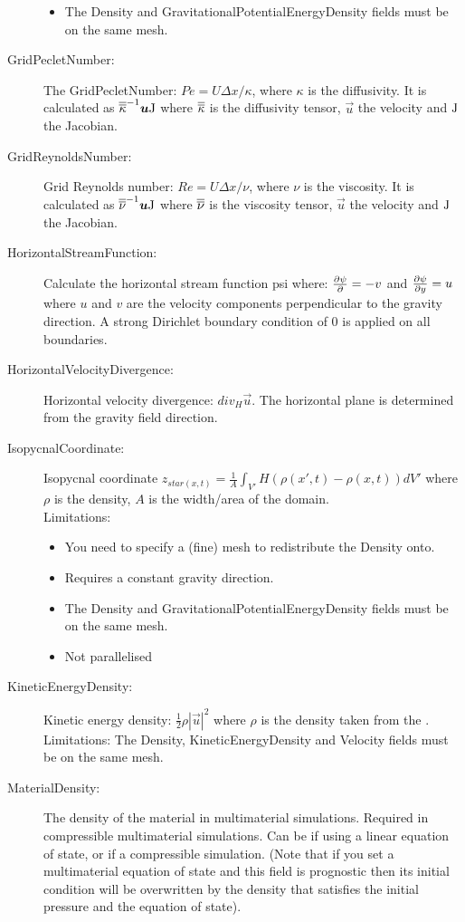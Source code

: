 \begin{description}
\begin{itemize}
	\item The Density and GravitationalPotentialEnergyDensity fields must be on the same mesh. 
	\end{itemize}
\item[GridPecletNumber:]The GridPecletNumber: $Pe = U\Delta x/\kappa$, where $\kappa$ is the diffusivity. It is calculated as $\tensor{\kappa}^{-1}\vec{u}\mat{J}$ where $\tensor{\kappa}$ is the diffusivity tensor, $\vec{u}$ the velocity and $\mat{J}$ the Jacobian.
\item[GridReynoldsNumber:]Grid Reynolds number: $Re = U\Delta x/\nu$, where $\nu$ is the viscosity. It is calculated as $\tensor{\nu}^{-1}\vec{u}\mat{J}$ where $\tensor{\nu}$ is the viscosity tensor, $\vec{u}$ the velocity and $\mat{J}$ the Jacobian.
\item[HorizontalStreamFunction:]Calculate the horizontal stream function psi where:  $\ppx[]{\psi} = -v$ and  $\ppx[y]{\psi}  = u$ where $u$ and $v$ are the velocity components perpendicular to the gravity direction. A strong Dirichlet boundary condition of $0$ is applied on all boundaries.  
\item[HorizontalVelocityDivergence:]Horizontal velocity divergence: ${div}_H \vec{u}$. The horizontal plane is determined from the gravity field direction. 
\item[IsopycnalCoordinate:]Isopycnal coordinate
	$z_{star(x,t)} = \frac{1}{A} \int_{V'} H(\rho(x',t)-\rho(x,t)) dV'$ where $\rho$ is the density, $A$ is the width/area of the domain. \\
	Limitations:
	\begin{itemize}
	\item You need to specify a (fine) mesh to redistribute the Density onto.
	\item Requires a constant gravity direction. 
	\item The Density and GravitationalPotentialEnergyDensity fields must be on the same mesh. 
	\item Not parallelised
	\end{itemize} 
\item[KineticEnergyDensity:]Kinetic energy density: $\frac{1}{2} \rho |\vec{u}|^2$ where $\rho$ is the density taken from the . \\
	Limitations: The Density, KineticEnergyDensity and Velocity fields must be on the same mesh.  
\item[MaterialDensity:]The density of the material in multimaterial simulations. Required in compressible multimaterial simulations. Can be  if using a linear equation of state, or  if a compressible simulation. (Note that if you set a multimaterial equation of state and this field is prognostic then its initial condition will be overwritten by the density that satisfies the initial pressure and the equation of state).

\end{description}
